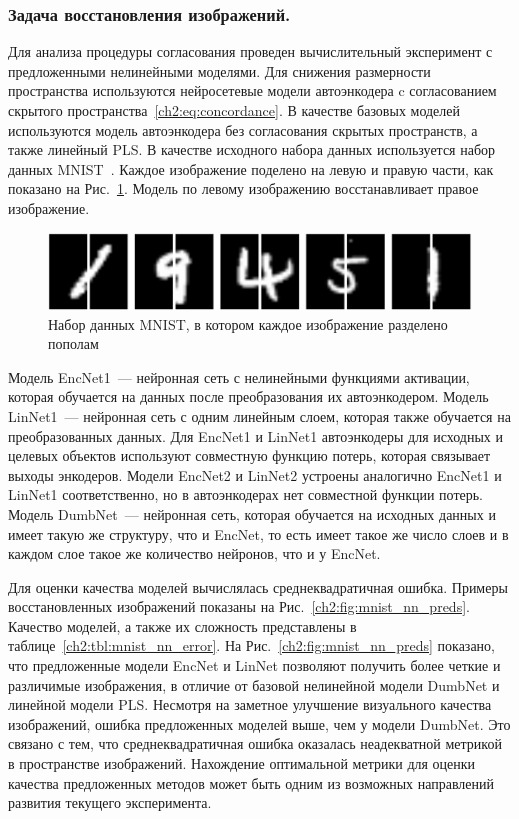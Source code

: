 \subsubsection{Задача восстановления изображений.}
Для анализа процедуры согласования проведен вычислительный эксперимент с предложенными нелинейными моделями.
Для снижения размерности пространства используются нейросетевые модели автоэнкодера c согласованием скрытого пространства~\eqref{ch2:eq:concordance}.
В качестве базовых моделей используются модель автоэнкодера без согласования скрытых пространств, а также линейный PLS. В качестве исходного набора данных используется набор данных MNIST~\cite{MNIST}. Каждое изображение поделено на левую и правую части, как показано на Рис.~\ref{ch2:fig:left_right_mnist}. Модель по левому изображению восстанавливает правое изображение.

\begin{figure}[ht]
\centering \includegraphics[width=\linewidth]{figs/ch2/left_right_mnist}
\caption{Набор данных MNIST, в котором каждое изображение разделено пополам}
\label{ch2:fig:left_right_mnist}
\end{figure}

Модель EncNet1~--- нейронная сеть с нелинейными функциями активации, которая обучается на данных после преобразования их автоэнкодером. Модель LinNet1~--- нейронная сеть с одним линейным слоем, которая также обучается на преобразованных данных. Для EncNet1 и LinNet1 автоэнкодеры для исходных и целевых объектов используют совместную функцию потерь, которая связывает выходы энкодеров. Модели EncNet2 и LinNet2 устроены аналогично EncNet1 и LinNet1 соответственно, но в автоэнкодерах нет совместной функции потерь. Модель DumbNet~---  нейронная сеть, которая обучается на исходных данных и имеет такую же структуру, что и EncNet, то есть имеет такое же число слоев и в каждом слое такое же количество нейронов, что и у EncNet.

Для оценки качества моделей вычислялась среднеквадратичная ошибка. Примеры восстановленных изображений показаны на Рис.~\ref{ch2:fig:mnist_nn_preds}. Качество моделей, а также их сложность представлены в таблице~\ref{ch2:tbl:mnist_nn_error}.
На Рис.~\ref{ch2:fig:mnist_nn_preds} показано, что предложенные модели EncNet и LinNet позволяют получить более четкие и различимые изображения, в отличие от базовой нелинейной модели DumbNet и линейной модели PLS.
Несмотря на заметное улучшение визуального качества изображений, ошибка предложенных моделей выше, чем у модели DumbNet.
Это связано с тем, что среднеквадратичная ошибка оказалась неадекватной метрикой в пространстве изображений.
Нахождение оптимальной метрики для оценки качества предложенных методов может быть одним из возможных направлений развития текущего эксперимента.

